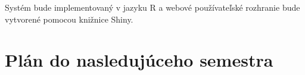 \documentclass[a4paper,slovak,12pt,appendix]{article}
\begin{document}
Systém bude implementovaný v jazyku R a webové používateľské rozhranie bude
vytvorené pomocou knižnice Shiny.

%
%
%
%
%
%
%
%
%

\newpage
\section{Plán do nasledujúceho semestra}
\end{document}
